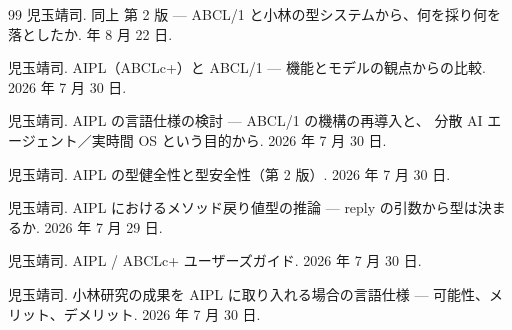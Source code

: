 \documentclass[11pt,a4paper]{ltjsarticle}
\theoremstyle{definition}
\theoremstyle{remark}
\begin{document}
\begin{thebibliography}{99}
児玉靖司.
\newblock 同上 第 2 版 --- ABCL/1 と小林の型システムから、何を採り何を落としたか.
 年 8 月 22 日.

児玉靖司.
\newblock AIPL（ABCLc+）と ABCL/1 --- 機能とモデルの観点からの比較. 2026 年 7 月 30 日.

児玉靖司.
\newblock AIPL の言語仕様の検討 --- ABCL/1 の機構の再導入と、
分散 AI エージェント／実時間 OS という目的から. 2026 年 7 月 30 日.

児玉靖司.
\newblock AIPL の型健全性と型安全性（第 2 版）. 2026 年 7 月 30 日.

児玉靖司.
\newblock AIPL におけるメソッド戻り値型の推論 --- reply の引数から型は決まるか.
2026 年 7 月 29 日.

児玉靖司.
\newblock AIPL / ABCLc+ ユーザーズガイド. 2026 年 7 月 30 日.

児玉靖司.
\newblock 小林研究の成果を AIPL に取り入れる場合の言語仕様 ---
可能性、メリット、デメリット. 2026 年 7 月 30 日.

\end{thebibliography}
\end{document}

